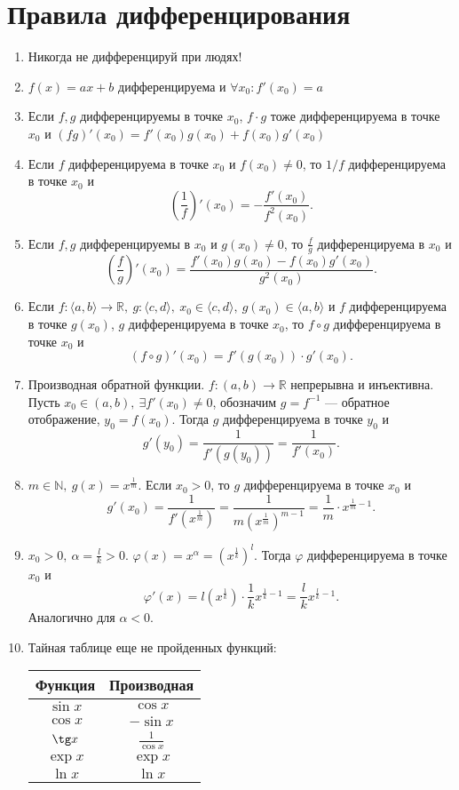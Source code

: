 \documentclass[11pt]{book}
\newcommand{\N}{\mathbb{N}}
\newcommand{\R}{\mathbb{R}}
\theoremstyle{definition}
\theoremstyle{plain}
\theoremstyle{plain}
\theoremstyle{definition}
\theoremstyle{remark}
\begin{document}
\section{Правила дифференцирования}
\begin{enumerate}[start=0]
    \item Никогда не дифференцируй при людях!
    \item $ f(x) = ax + b$ дифференцируема и $ \forall x_0: f'(x_0) = a$
    \item
	Если $ f, g$ дифференцируемы в точке $ x_0$, $ f\cdot g$ тоже дифференцируема в точке  $ x_0$ и $ (fg)'(x_0) =f'(x_0)g(x_0) + f(x_0)g'(x_0)$
    \item Если $ f$ дифференцируема в точке $ x_0$ и $ f(x_0) \ne 0$, то $ 1 / f$ дифференцируема в точке $ x_0$ и
	\[
	    \left( \frac{1}{f} \right)' (x_0) = - \frac{f'(x_0)}{f^2(x_0)}
	.\]
    \item Если $ f, g$ дифференцируемы в $ x_0$ и $ g(x_0) \ne 0$, то $ \frac{f}{g}$ дифференцируема в $ x_0$ и \[
	    \left( \frac{f}{g} \right) '(x_0) = \frac{f'(x_0) g(x_0)-f(x_0)g'(x_0)}{g^2(x_0)}
	.\]
    \item Если $ f: \langle a, b \rangle \to \R, ~ g: \langle c, d \rangle , ~ x_0 \in \langle c, d \rangle, ~ g(x_0) \in \langle a, b \rangle$ и $ f$ дифференцируема в точке  $ g(x_0)$, $ g$ дифференцируема в точке $ x_0$, то $ f \circ g$ дифференцируема в точке $ x_0$ и
	\[
	    (f \circ g)'(x_0) = f'(g(x_0)) \cdot g'(x_0)
	.\]
    \item Производная обратной функции. $ f: (a, b) \to  \R$ непрерывна и инъективна. Пусть $ x_0 \in (a, b), ~ \exists f'(x_0) \ne 0$, обозначим $ g = f^{-1}$ --- обратное отображение, $ y_0 = f(x_0)$.
	Тогда $ g$ дифференцируема в точке $ y_0$ и
	\[
	    g'(y_0) = \frac{1}{f'(g(y_0))} = \frac{1}{f'(x_0)}
	.\]
    \item $ m \in \N, ~ g(x) = x ^{\frac{1}{m}}$. Если $ x_0 >0$, то $ g$ дифференцируема в точке $ x_0$ и
	\[
	    g'(x_0) = \frac{1}{f'\left(x ^{\frac{1}{m}}\right)} = \frac{1}{m \left( x ^{\frac{1}{m}} \right) ^{m-1}} = \frac{1}{m}\cdot x^{\frac{1}{m}-1}
	.\]
    \item $ x_0>0, ~ \alpha = \frac{l}{k} >0$. $ \varphi (x) = x^{\alpha} = \left( x^{\frac{1}{k}} \right)^{l}$.
	Тогда $ \varphi $ дифференцируема в точке $ x_0$ и \[
	    \varphi '(x) = l\left(x^{\frac{1}{k}}\right) \cdot \frac{1}{k} x ^{\frac{1}{k}-1}  =  \frac{l}{k} x^{\frac{l}{k}-1}
	.\]
	Аналогично для $ \alpha <0$.
    \item Тайная таблице еще не пройденных функций:

	\renewcommand{\arraystretch}{1.5}
	\begin{tabular}[ht]{c|c}
	    Функция & Производная \\
	    \hline
	    $ \sin x $ & $ \cos x$\\
	    \hline
	    $ \cos x $ & $ -\sin x$\\
	    \hline
	    $ \tg x $ & $ \frac{1}{\cos x} $\\
	    \hline
	    $ \exp x $ & $ \exp x$\\
	    \hline
	    $ \ln x $ & $ \ln x$\\
	\end{tabular}
\end{enumerate}
\end{document}
